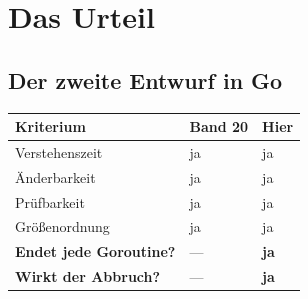 \part{Das Urteil}

\chapter{Der zweite Entwurf in Go}\label{kap:zweiter}

\begin{merksatz}
\begin{center}
\renewcommand{\arraystretch}{1.5}
\begin{tabular}{@{}P{3.2cm}P{2.2cm}P{2.6cm}@{}}
\toprule
\textbf{Kriterium} & \textbf{Band 20} & \textbf{Hier}\\
\midrule
Verstehenszeit & \textcolor{gruen}{ja} & \textcolor{gruen}{ja}\\
Änderbarkeit & \textcolor{gruen}{ja} & \textcolor{gruen}{ja}\\
Prüfbarkeit & \textcolor{gruen}{ja} & \textcolor{gruen}{ja}\\
Größenordnung & \textcolor{gruen}{ja} & \textcolor{gruen}{ja}\\
\midrule
\textbf{Endet jede Goroutine?} & --- & \textcolor{gruen}{\textbf{ja}}\\
\textbf{Wirkt der Abbruch?} & --- & \textcolor{gruen}{\textbf{ja}}\\
\bottomrule
\end{tabular}
\end{center}

\begin{center}
\begin{minipage}{0.88\textwidth}
\end{minipage}
\end{center}
\end{merksatz}

